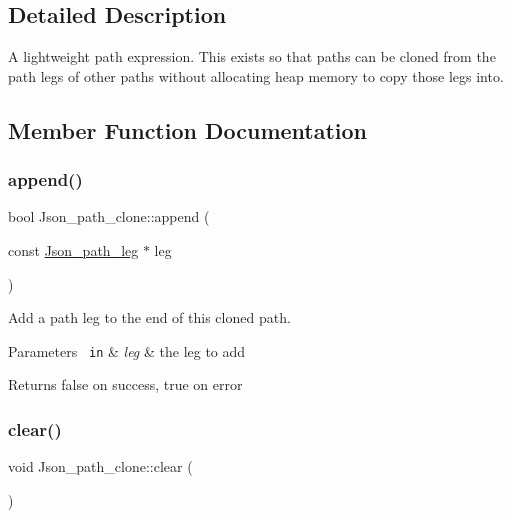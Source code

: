 \subsection{Detailed Description}
A lightweight path expression. This exists so that paths can be cloned from the path legs of other paths without allocating heap memory to copy those legs into. 

\subsection{Member Function Documentation}
\mbox{\label{classJson__path__clone_a10400af44b31abfc2a77c7feedc954c0}} 
\subsubsection{\texorpdfstring{append()}{append()}}
{\footnotesize\ttfamily bool Json\+\_\+path\+\_\+clone\+::append (\begin{DoxyParamCaption}\item[{const \mbox{\hyperlink{classJson__path__leg}{Json\+\_\+path\+\_\+leg}} $\ast$}]{leg }\end{DoxyParamCaption})}

Add a path leg to the end of this cloned path. 
\begin{DoxyParams}[1]{Parameters}
\mbox{\texttt{ in}}  & {\em leg} & the leg to add \\
\hline
\end{DoxyParams}
\begin{DoxyReturn}{Returns}
false on success, true on error 
\end{DoxyReturn}
\mbox{\label{classJson__path__clone_a85503f72b0c86c105fa2573e4fdb2d47}} 
\subsubsection{\texorpdfstring{clear()}{clear()}}
{\footnotesize\ttfamily void Json\+\_\+path\+\_\+clone\+::clear (\begin{DoxyParamCaption}{ }\end{DoxyParamCaption})}

